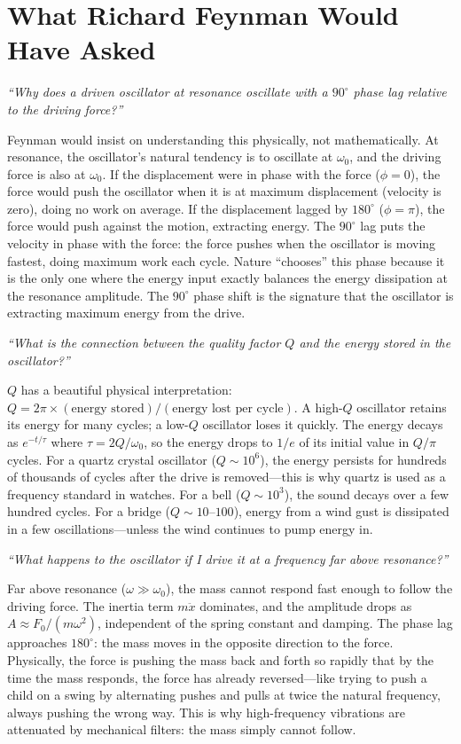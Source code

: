 \documentclass[11pt,openright]{book}
\begin{document}
\section*{What Richard Feynman Would Have Asked}

\textit{``Why does a driven oscillator at resonance oscillate with a $90^\circ$ phase lag relative to the driving force?''}

Feynman would insist on understanding this physically, not mathematically. At resonance, the oscillator's natural tendency is to oscillate at $\omega_0$, and the driving force is also at $\omega_0$. If the displacement were in phase with the force ($\phi = 0$), the force would push the oscillator when it is at maximum displacement (velocity is zero), doing no work on average. If the displacement lagged by $180^\circ$ ($\phi = \pi$), the force would push against the motion, extracting energy. The $90^\circ$ lag puts the velocity in phase with the force: the force pushes when the oscillator is moving fastest, doing maximum work each cycle. Nature ``chooses'' this phase because it is the only one where the energy input exactly balances the energy dissipation at the resonance amplitude. The $90^\circ$ phase shift is the signature that the oscillator is extracting maximum energy from the drive.

\textit{``What is the connection between the quality factor $Q$ and the energy stored in the oscillator?''}

$Q$ has a beautiful physical interpretation: $Q = 2\pi \times (\text{energy stored})/(\text{energy lost per cycle})$. A high-$Q$ oscillator retains its energy for many cycles; a low-$Q$ oscillator loses it quickly. The energy decays as $e^{-t/\tau}$ where $\tau = 2Q/\omega_0$, so the energy drops to $1/e$ of its initial value in $Q/\pi$ cycles. For a quartz crystal oscillator ($Q \sim 10^6$), the energy persists for hundreds of thousands of cycles after the drive is removed---this is why quartz is used as a frequency standard in watches. For a bell ($Q \sim 10^3$), the sound decays over a few hundred cycles. For a bridge ($Q \sim 10$--$100$), energy from a wind gust is dissipated in a few oscillations---unless the wind continues to pump energy in.

\textit{``What happens to the oscillator if I drive it at a frequency far above resonance?''}

Far above resonance ($\omega \gg \omega_0$), the mass cannot respond fast enough to follow the driving force. The inertia term $m\ddot{x}$ dominates, and the amplitude drops as $A \approx F_0/(m\omega^2)$, independent of the spring constant and damping. The phase lag approaches $180^\circ$: the mass moves in the opposite direction to the force. Physically, the force is pushing the mass back and forth so rapidly that by the time the mass responds, the force has already reversed---like trying to push a child on a swing by alternating pushes and pulls at twice the natural frequency, always pushing the wrong way. This is why high-frequency vibrations are attenuated by mechanical filters: the mass simply cannot follow.
\end{document}
